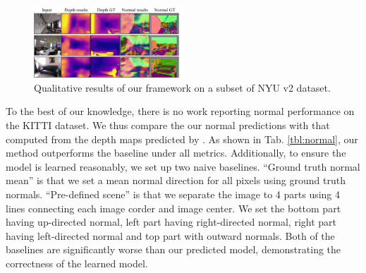 \begin{figure}[h]
\centering
\includegraphics[width=0.5\textwidth]{figures/indoor_visual_comp.pdf}
\caption{Qualitative results of our framework on a subset of NYU v2 dataset.}
\vspace{-2.\baselineskip}
\label{fig:nyu_visual}
\end{figure}

To the best of our knowledge, there is no work reporting normal performance on the KITTI dataset. We thus compare the our normal predictions with that computed from the depth maps predicted by \cite{zhou2017unsupervised}. As shown in Tab. \ref{tbl:normal}, our method outperforms the baseline under all metrics. Additionally, to ensure the model is learned reasonably, we set up two naive baselines. ``Ground truth normal mean'' is that we set a mean normal direction for all pixels using ground truth normals. ``Pre-defined scene'' is that we separate the image to 4 parts using 4 lines connecting each image corder and image center. We set the bottom part having up-directed normal, left part having right-directed normal, right part having left-directed normal and top part with outward normals. Both of the baselines are significantly worse than our predicted model, demonstrating the correctness of the learned model.



